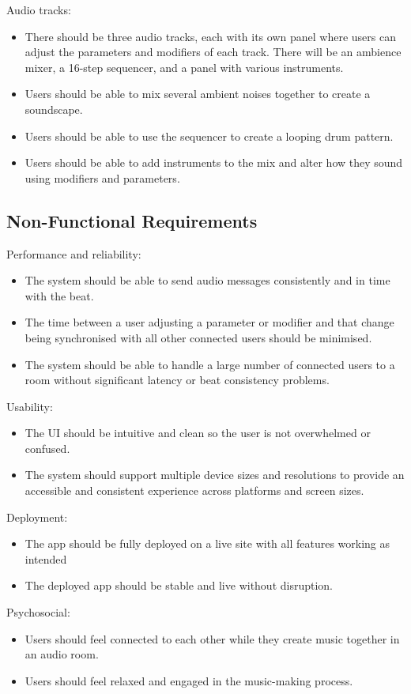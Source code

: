 Audio tracks:
\begin{itemize}
    \item 
        There should be three audio tracks, each with its own panel where users can adjust the parameters and modifiers of each track. There will be an ambience mixer, a 16-step sequencer, and a panel with various instruments.
    \item 
        Users should be able to mix several ambient noises together to create a soundscape.
    \item 
        Users should be able to use the sequencer to create a looping drum pattern.
    \item 
        Users should be able to add instruments to the mix and alter how they sound using modifiers and parameters.
\end{itemize}

\subsection{Non-Functional Requirements}

Performance and reliability:
\begin{itemize}
    \item 
        The system should be able to send audio messages consistently and in time with the beat.
    \item 
        The time between a user adjusting a parameter or modifier and that change being synchronised with all other connected users should be minimised.
    \item 
        The system should be able to handle a large number of connected users to a room without significant latency or beat consistency problems.
\end{itemize}

Usability:
\begin{itemize}
    \item 
        The UI should be intuitive and clean so the user is not overwhelmed or confused.
    \item 
        The system should support multiple device sizes and resolutions to provide an accessible and consistent experience across platforms and screen sizes.
\end{itemize}

Deployment:
\begin{itemize}
    \item 
        The app should be fully deployed on a live site with all features working as intended
    \item 
        The deployed app should be stable and live without disruption.
\end{itemize}

Psychosocial:
\begin{itemize}
    \item 
        Users should feel connected to each other while they create music together in an audio room.
    \item 
        Users should feel relaxed and engaged in the music-making process.
\end{itemize}
